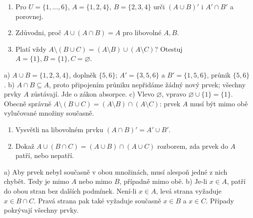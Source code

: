 \documentclass[11pt,a4paper]{article}
\begin{document}
\begin{zadaniReseniBox}[title={S1: použít pravidlo a najít protipříklad},breakable=false]
\begin{enumerate}[label=\alph*)]
\item Pro $U=\{1,\ldots,6\}$, $A=\{1,2,4\}$, $B=\{2,3,4\}$
urči $(A\cup B)'$ i $A'\cap B'$ a porovnej.
\item Zdůvodni, proč $A\cup(A\cap B)=A$ pro libovolné $A,B$.
\item Platí vždy $A\setminus(B\cup C)=(A\setminus B)\cup(A\setminus C)$?
Otestuj $A=\{1\},B=\{1\},C=\varnothing$.
\end{enumerate}
\tcblower
a) $A\cup B=\{1,2,3,4\}$, doplněk $\{5,6\}$;
$A'=\{3,5,6\}$ a $B'=\{1,5,6\}$, průnik $\{5,6\}$.
b) $A\cap B\subseteq A$, proto připojením průniku nepřidáme žádný nový prvek;
všechny prvky $A$ zůstávají. Jde o zákon absorpce.
c) Vlevo $\varnothing$, vpravo $\varnothing\cup\{1\}=\{1\}$.
Obecně správně $A\setminus(B\cup C)=(A\setminus B)\cap(A\setminus C)$:
prvek $A$ musí být mimo obě vylučované množiny současně.
\end{zadaniReseniBox}

\begin{zadaniReseniBox}[title={R1: druhé odvození, 10–15 minut},breakable=false]
\begin{enumerate}[label=\alph*)]
\item Vysvětli na libovolném prvku $(A\cap B)'=A'\cup B'$.
\item Dokaž $A\cup(B\cap C)=(A\cup B)\cap(A\cup C)$ rozborem,
zda prvek do $A$ patří, nebo nepatří.
\end{enumerate}
\tcblower
a) Aby prvek nebyl současně v obou množinách, musí alespoň jedné z nich chybět.
Tedy je mimo $A$ nebo mimo $B$, případně mimo obě.
b) Je-li $x\in A$, patří do obou stran bez dalších podmínek.
Není-li $x\in A$, levá strana vyžaduje $x\in B\cap C$.
Pravá strana pak také vyžaduje současně $x\in B$ a $x\in C$.
Případy pokrývají všechny prvky.
\end{zadaniReseniBox}
\end{document}
